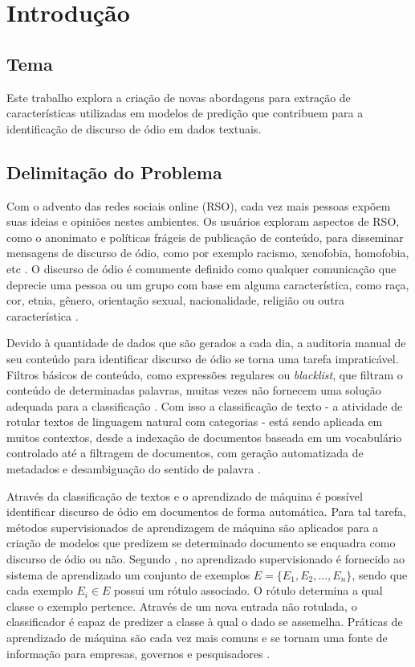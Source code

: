 \chapter{Introdução}

\section{Tema}
Este trabalho explora a criação de novas abordagens para extração de características utilizadas em modelos de predição que contribuem para a identificação de discurso de ódio em dados textuais.

\section{Delimitação do Problema}
Com o advento das redes sociais online (RSO), cada vez mais pessoas expõem suas ideias e opiniões nestes ambientes. Os usuários exploram aspectos de RSO, como o anonimato e políticas frágeis de publicação de conteúdo, para disseminar mensagens de discurso de ódio, como por exemplo racismo, xenofobia, homofobia, etc \cite{almeida2017abordagem}. O discurso de ódio é comumente definido como qualquer comunicação que deprecie uma pessoa ou um grupo com base em alguma característica, como raça, cor, etnia, gênero, orientação sexual, nacionalidade, religião ou outra característica \cite{nockleby2000hate}.

Devido à quantidade de dados que são gerados a cada dia, a auditoria manual de seu conteúdo para identificar discurso de ódio se torna uma tarefa impraticável. Filtros básicos de conteúdo, como expressões regulares ou \textit{blacklist}, que filtram o conteúdo de determinadas palavras, muitas vezes não fornecem uma solução adequada para a classificação \cite{schmidt2017survey}. Com isso a classificação de texto - a atividade de rotular textos de linguagem natural com categorias - está sendo aplicada em muitos contextos, desde a indexação de documentos baseada em um vocabulário controlado até a filtragem de documentos, com geração automatizada de metadados e desambiguação do sentido de palavra \cite{sebastiani2002machine}.
 
Através da classificação de textos e o aprendizado de máquina é possível identificar discurso de ódio em documentos de forma automática. Para tal tarefa, métodos supervisionados de aprendizagem de máquina são aplicados para a criação de modelos que predizem se determinado documento se enquadra como discurso de ódio ou não. Segundo \cite{batista2003pre}, no aprendizado supervisionado é fornecido ao sistema de aprendizado um conjunto de exemplos $E = \{E_1, E_2,...,E_n\}$, sendo que cada exemplo $E_i \in E$ possui um rótulo associado. O rótulo determina a qual classe o exemplo pertence. Através de um nova entrada não rotulada, o classificador é capaz de predizer a classe à qual o dado se assemelha. Práticas de aprendizado de máquina são cada vez mais comuns e se tornam uma fonte de informação para empresas, governos e pesquisadores \cite{almeida2017abordagem}.
 
